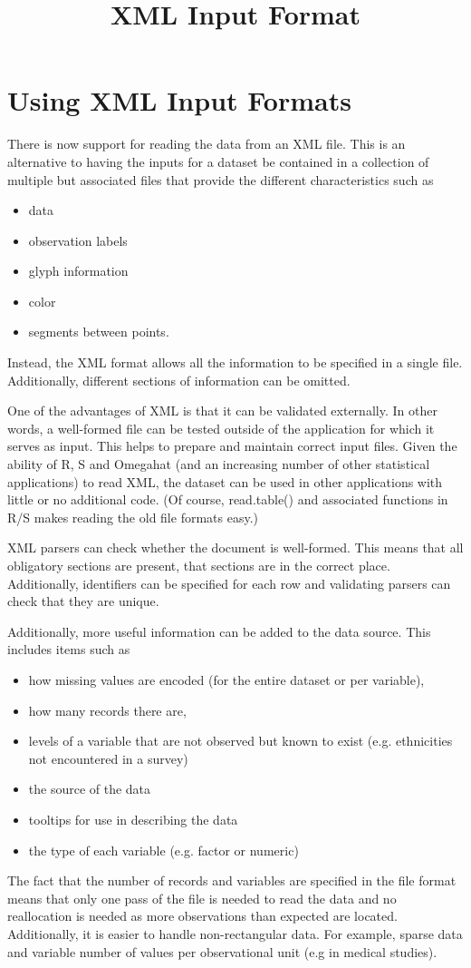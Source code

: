 \documentclass{article}
\title{XML Input Format}
\begin{document}
\section{Using XML Input Formats}
There is now support for reading the data from an XML
file.
This is an alternative to having the inputs
for a dataset be contained in a collection of multiple but associated files
that provide the different characteristics such as 
\begin{itemize}
\item data
\item observation labels
\item glyph information
\item color
\item segments between points.
\end{itemize}
Instead, the XML format allows all the information to be specified in
a single file.  Additionally, different sections of information can be
omitted.


One of the advantages of XML is that it can be validated externally.
In other words, a well-formed file can be tested outside of the
application for which it serves as input.  This helps to prepare and
maintain correct input files.  Given the ability of R, S and Omegahat
(and an increasing number of other statistical applications) to read
XML, the dataset can be used in other applications with little or no
additional code.  (Of course, read.table() and associated functions in
R/S makes reading the old file formats easy.)

XML parsers can check whether the document is well-formed.  This means
that all obligatory sections are present, that sections are in the
correct place.  Additionally, identifiers can be specified for each
row and validating parsers can check that they are unique.

Additionally, more useful information can be added
to the data source.
This includes items such as 
\begin{itemize}
\item how missing values
      are encoded (for the entire dataset or per variable),
\item how many records there are, 
\item levels of a variable that are not observed
      but known to exist (e.g. ethnicities not encountered in a survey)
\item the source of the data
\item tooltips for use in describing the data
\item the type of each variable (e.g. factor or numeric)
\end{itemize}
The fact that the number of records and variables are specified in the
file format means that only one pass of the file is needed to read the
data and no reallocation is needed as more observations than expected
are located.  Additionally, it is easier to handle non-rectangular
data.  For example, sparse data and variable number of values per
observational unit (e.g in medical studies).
\end{document}
